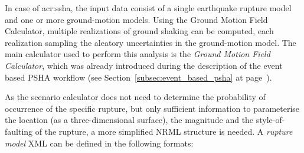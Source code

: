 In case of \gls{acr:ssha}, the input data consist of a single earthquake
rupture model and one or more ground-motion models. Using the Ground Motion Field Calculator, multiple realizations of ground shaking can be computed, each realization sampling the aleatory uncertainties in the ground-motion model. The main calculator used to perform this analysis is the \emph{Ground Motion Field Calculator}, which was already introduced during the description of the event based PSHA workflow (see Section~\ref{subsec:event_based_psha} at page~\pageref{subsec:event_based_psha}).

As the scenario calculator does not need to determine the probability of occurrence of the specific rupture, but only sufficient information to parameterise the location (as a three-dimensional surface), the magnitude and the style-of-faulting of the rupture, a more simplified NRML structure is needed. A \emph{rupture model} XML can be defined in the following formats:

